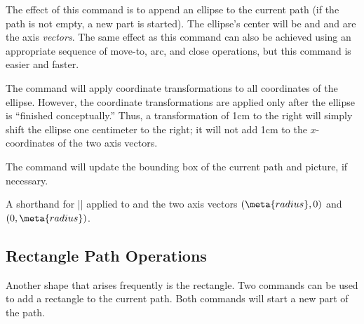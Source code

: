 \begin{command}{\pgfpathellipse{}}
  The effect of this command is to append an ellipse to the current
  path (if the path is not empty, a new part is started). The
  ellipse's center will be  and  and
   are the axis \emph{vectors}. The same effect as
  this command can also be achieved using an appropriate sequence of
  move-to, arc, and close operations, but this command is easier and
  faster.

\begin{codeexample}[]
\end{codeexample}

  The command will apply coordinate transformations to all coordinates
  of the ellipse. However, the coordinate transformations are applied
  only after the ellipse is ``finished conceptually.'' Thus, a
  transformation of 1cm to the right will simply shift the ellipse one
  centimeter to the right; it will not add 1cm to the $x$-coordinates
  of the two axis vectors.

  The command will update the bounding box of the current path and
  picture, if necessary.
\end{command}

\begin{command}{\pgfpathcircle{}}
  A shorthand for |\pgfpathellipse| applied to  and the
  two axis vectors $(\meta{radius},0)$ and $(0,\meta{radius})$.
\end{command}


\subsection{Rectangle Path Operations}

Another shape that arises frequently is the rectangle. Two commands
can be used to add a rectangle to the current path. Both commands will
start a new part of the path.


